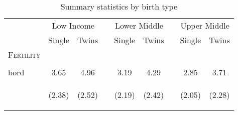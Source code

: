 \documentclass{article}[11pt,subeqn]
\begin{document}
\begin{spacing}{1.5}
\begin{table}[ht]
\caption{Summary statistics by birth type}
\label{tab:missing}
\vspace{-7mm}
\begin{center}
\begin{tabular}{lccp{5mm}ccp{5mm}cc} 
\toprule
  & \multicolumn{2}{c}{Low Income} & & \multicolumn{2}{c}{Lower Middle}& & \multicolumn{2}{c}{Upper Middle} \\ \cmidrule(r){2-3} \cmidrule(r){5-6} \cmidrule(r){8-9} 
 & Single & Twins && Single & Twins&& Single & Twins \\ \midrule
\textsc{Fertility} & & &&&&&& \\																
\begin{footnotesize}\end{footnotesize}	&	\begin{footnotesize}\end{footnotesize}	&	\begin{footnotesize}\end{footnotesize}	&	\begin{footnotesize}\end{footnotesize} &	\begin{footnotesize}\end{footnotesize}	&	\begin{footnotesize}\end{footnotesize}	&	\begin{footnotesize}\end{footnotesize} &	\begin{footnotesize}\end{footnotesize}	&	\begin{footnotesize}\end{footnotesize}		\\
bord	&	3.65	&	4.96	&	&	3.19	&	4.29	&	&	2.85	&	3.71		\\
\begin{footnotesize}\end{footnotesize}	& \begin{footnotesize} (2.38)\end{footnotesize} & \begin{footnotesize} (2.52)\end{footnotesize} & \begin{footnotesize} 	\end{footnotesize} & \begin{footnotesize} (2.19)\end{footnotesize} & \begin{footnotesize} (2.42)\end{footnotesize} & \begin{footnotesize} 	\end{footnotesize} & \begin{footnotesize} (2.05)\end{footnotesize} & \begin{footnotesize} (2.28)\end{footnotesize}	\\

\end{tabular}
\end{center}
\end{table}
\end{spacing}
\end{document}
